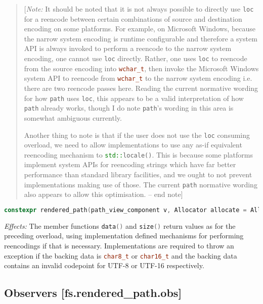 \documentclass[11pt]{article}
\newcommand{\code}[2][cpp]{\lstinline[language=#1,basicstyle=\small\ttfamily]{#2}}
\newcommand{\desc}[1]{\textit{#1}}
\newcommand{\effects}{\desc{Effects: }}
\newcommand{\note}[1]{\begin{quote}[\textit{Note:} #1 -- end note]\end{quote}}
\begin{document}
\begin{itemize}
\color{black}

\note{It should be noted that it is not always possible to directly use \code{loc} for a reencode between certain combinations of source and destination encoding on some platforms. For example, on Microsoft Windows, because the narrow system encoding is runtime configurable and therefore a system API is always invoked to perform a reencode to the narrow system encoding, one cannot use \code{loc} directly. Rather, one uses \code{loc} to reencode from the source encoding into \code{wchar_t}, then invoke the Microsoft Windows system API to reencode from \code{wchar_t} to the narrow system encoding i.e. there are two reencode passes here. Reading the current normative wording for how \code{path} uses \code{loc}, this appears to be a valid interpretation of how \code{path} already works, though I do note \code{path}'s wording in this area is somewhat ambiguous currently.

Another thing to note is that if the user does not use the \code{loc} consuming overload, we need to allow implementations to use any as-if equivalent reencoding mechanism to \code{std::locale()}. This is because some platforms implement system APIs for reencoding strings which have far better performance than standard library facilities, and we ought to not prevent implementations making use of those. The current \code{path} normative wording also appears to allow this optimisation.}

\color{darkgreen}

\end{itemize}

\begin{lstlisting}[language=cpp]
    constexpr rendered_path(path_view_component v, Allocator allocate = Allocator());
\end{lstlisting}

\effects The member functions \code{data()} and \code{size()} return values as for the preceding overload, using implementation defined mechanisms for performing reencodings if that is necessary. Implementations are required to throw an exception if the backing data is \code{char8_t} or \code{char16_t} and the backing data contains an invalid codepoint for UTF-8 or UTF-16 respectively.\\

\subsection*{Observers [fs.rendered\_path.obs]}
\end{document}
